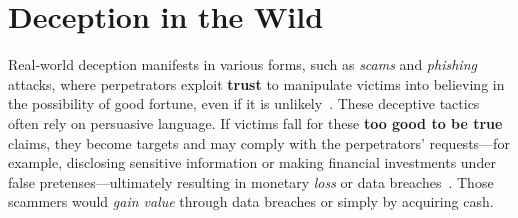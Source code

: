\section{Deception in the Wild}



Real-world deception manifests in various forms, such as \textit{scams} and \textit{phishing} attacks, where perpetrators exploit \textbf{trust} to manipulate victims into believing in the possibility of good fortune, even if it is unlikely~\citep{button2014online,muscanell2014weapons,hanoch2021scams}. These deceptive tactics often rely on persuasive language. If victims fall for these \textbf{too good to be true} claims, they become targets and may comply with the perpetrators' requests---for example, disclosing sensitive information or making financial investments under false pretenses---ultimately resulting in monetary \textit{loss} or data breaches~\citep{burnes2017prevalence,coluccia2020online}. Those scammers would \textit{gain value} through data breaches or simply by acquiring cash.


